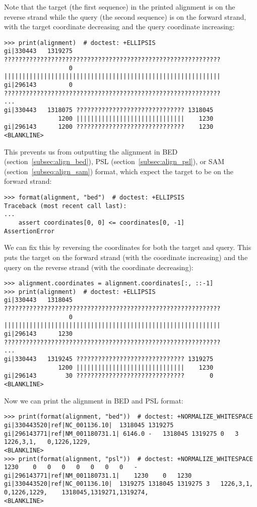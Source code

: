 Note that the target (the first sequence) in the printed alignment is on the reverse strand while the query (the second sequence) is on the forward strand, with the target coordinate decreasing and the query coordinate increasing:
\begin{verbatim}
>>> print(alignment)  # doctest: +ELLIPSIS
gi|330443   1319275 ????????????????????????????????????????????????????????????
                  0 ||||||||||||||||||||||||||||||||||||||||||||||||||||||||||||
gi|296143         0 ????????????????????????????????????????????????????????????
...
gi|330443   1318075 ?????????????????????????????? 1318045
               1200 ||||||||||||||||||||||||||||||    1230
gi|296143      1200 ??????????????????????????????    1230
<BLANKLINE>
\end{verbatim}
This prevents us from outputting the alignment in BED (section~\ref{subsec:align_bed}),  PSL (section~\ref{subsec:align_psl}), or SAM (section~\ref{subseq:align_sam}) format, which expect the target to be on the forward strand:
\begin{verbatim}
>>> format(alignment, "bed")  # doctest: +ELLIPSIS
Traceback (most recent call last):
...
    assert coordinates[0, 0] <= coordinates[0, -1]
AssertionError
\end{verbatim}
We can fix this by reversing the coordinates for both the target and query.
This puts the target on the forward strand (with the coordinate increasing) and the query on the reverse strand (with the coordinate decreasing):
\begin{verbatim}
>>> alignment.coordinates = alignment.coordinates[:, ::-1]
>>> print(alignment)  # doctest: +ELLIPSIS
gi|330443   1318045 ????????????????????????????????????????????????????????????
                  0 ||||||||||||||||||||||||||||||||||||||||||||||||||||||||||||
gi|296143      1230 ????????????????????????????????????????????????????????????
...
gi|330443   1319245 ?????????????????????????????? 1319275
               1200 ||||||||||||||||||||||||||||||    1230
gi|296143        30 ??????????????????????????????       0
<BLANKLINE>
\end{verbatim}
Now we can print the alignment in BED and PSL format:
\begin{verbatim}
>>> print(format(alignment, "bed"))  # doctest: +NORMALIZE_WHITESPACE
gi|330443520|ref|NC_001136.10|	1318045	1319275	gi|296143771|ref|NM_001180731.1| 6146.0	-	1318045	1319275	0	3	1226,3,1,	0,1226,1229,
<BLANKLINE>
>>> print(format(alignment, "psl"))  # doctest: +NORMALIZE_WHITESPACE
1230	0	0	0	0	0	0	0	-	gi|296143771|ref|NM_001180731.1|	1230	0	1230	gi|330443520|ref|NC_001136.10|	1319275	1318045	1319275	3	1226,3,1,	0,1226,1229,	1318045,1319271,1319274,
<BLANKLINE>
\end{verbatim}
